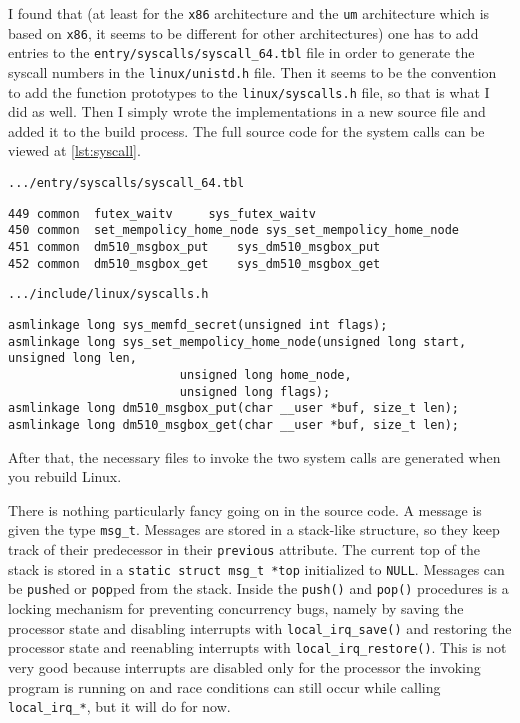 \documentclass{report}
\begin{document}
\sloppy I found that (at least for the \texttt{x86} architecture and the \texttt{um} architecture which is based on \texttt{x86}, it seems to be different for other architectures) one has to add entries to the \texttt{entry/syscalls/syscall\_64.tbl} file in order to generate the syscall numbers in the \texttt{linux/unistd.h} file. Then it seems to be the convention to add the function prototypes to the \texttt{linux/syscalls.h} file, so that is what I did as well. Then I simply wrote the implementations in a new source file and added it to the build process. The full source code for the system calls can be viewed at \autoref{lst:syscall}.

{


\begin{listing}[!ht]
	\caption{\texttt{.../entry/syscalls/syscall\_64.tbl}}
	\begin{verbatim}
449	common	futex_waitv		sys_futex_waitv
450	common	set_mempolicy_home_node	sys_set_mempolicy_home_node
451	common	dm510_msgbox_put	sys_dm510_msgbox_put
452	common	dm510_msgbox_get	sys_dm510_msgbox_get

\end{verbatim}
\end{listing}

\begin{listing}[!ht]
	\caption{\texttt{.../include/linux/syscalls.h}}
	\begin{verbatim}
asmlinkage long sys_memfd_secret(unsigned int flags);
asmlinkage long sys_set_mempolicy_home_node(unsigned long start, unsigned long len,
					    unsigned long home_node,
					    unsigned long flags);
asmlinkage long dm510_msgbox_put(char __user *buf, size_t len);
asmlinkage long dm510_msgbox_get(char __user *buf, size_t len);

\end{verbatim}
\end{listing}
}

After that, the necessary files to invoke the two system calls are generated when you rebuild Linux.

There is nothing particularly fancy going on in the source code. A message is given the type \texttt{msg\_t}. Messages are stored in a stack-like structure, so they keep track of their predecessor in their \texttt{previous} attribute. The current top of the stack is stored in a \texttt{static struct msg_t *top} initialized to \texttt{NULL}. Messages can be \texttt{push}ed or \texttt{pop}ped from the stack. Inside the \texttt{push()} and \texttt{pop()} procedures is a locking mechanism for preventing concurrency bugs, namely by saving the processor state and disabling interrupts with \texttt{local_irq_save()} and restoring the processor state and reenabling interrupts with \texttt{local_irq_restore()}. This is not very good because interrupts are disabled only for the processor the invoking program is running on and race conditions can still occur while calling \texttt{local_irq_*}, but it will do for now.
\end{document}
